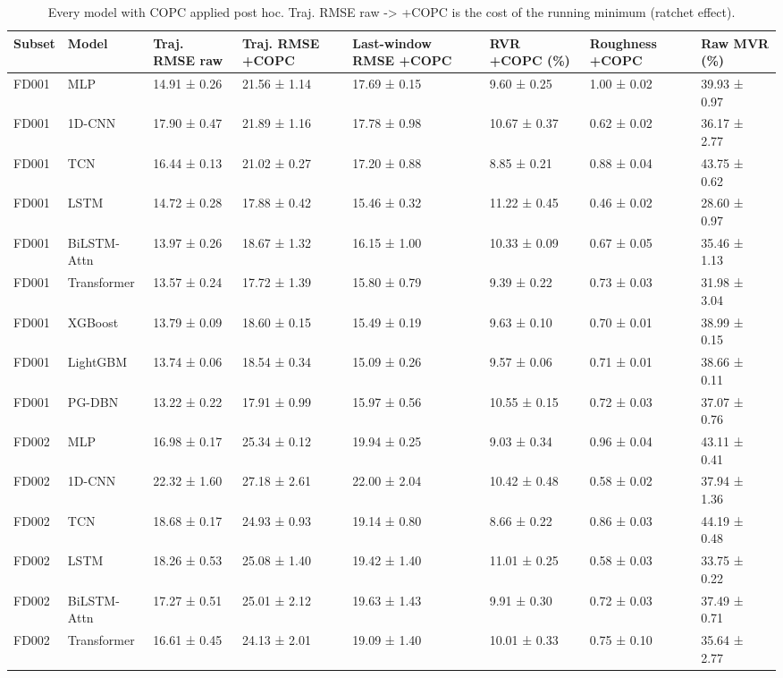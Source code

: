 \begin{table}
\caption{Every model with COPC applied post hoc. Traj. RMSE raw -> +COPC is the cost of the running minimum (ratchet effect).}
\label{tab:table1b_copc_all_models}
\begin{tabular}{llllllll}
\toprule
Subset & Model & Traj. RMSE raw & Traj. RMSE +COPC & Last-window RMSE +COPC & RVR +COPC (\%) & Roughness +COPC & Raw MVR (\%) \\
\midrule
FD001 & MLP & 14.91 ± 0.26 & 21.56 ± 1.14 & 17.69 ± 0.15 & 9.60 ± 0.25 & 1.00 ± 0.02 & 39.93 ± 0.97 \\
FD001 & 1D-CNN & 17.90 ± 0.47 & 21.89 ± 1.16 & 17.78 ± 0.98 & 10.67 ± 0.37 & 0.62 ± 0.02 & 36.17 ± 2.77 \\
FD001 & TCN & 16.44 ± 0.13 & 21.02 ± 0.27 & 17.20 ± 0.88 & 8.85 ± 0.21 & 0.88 ± 0.04 & 43.75 ± 0.62 \\
FD001 & LSTM & 14.72 ± 0.28 & 17.88 ± 0.42 & 15.46 ± 0.32 & 11.22 ± 0.45 & 0.46 ± 0.02 & 28.60 ± 0.97 \\
FD001 & BiLSTM-Attn & 13.97 ± 0.26 & 18.67 ± 1.32 & 16.15 ± 1.00 & 10.33 ± 0.09 & 0.67 ± 0.05 & 35.46 ± 1.13 \\
FD001 & Transformer & 13.57 ± 0.24 & 17.72 ± 1.39 & 15.80 ± 0.79 & 9.39 ± 0.22 & 0.73 ± 0.03 & 31.98 ± 3.04 \\
FD001 & XGBoost & 13.79 ± 0.09 & 18.60 ± 0.15 & 15.49 ± 0.19 & 9.63 ± 0.10 & 0.70 ± 0.01 & 38.99 ± 0.15 \\
FD001 & LightGBM & 13.74 ± 0.06 & 18.54 ± 0.34 & 15.09 ± 0.26 & 9.57 ± 0.06 & 0.71 ± 0.01 & 38.66 ± 0.11 \\
FD001 & PG-DBN & 13.22 ± 0.22 & 17.91 ± 0.99 & 15.97 ± 0.56 & 10.55 ± 0.15 & 0.72 ± 0.03 & 37.07 ± 0.76 \\
FD002 & MLP & 16.98 ± 0.17 & 25.34 ± 0.12 & 19.94 ± 0.25 & 9.03 ± 0.34 & 0.96 ± 0.04 & 43.11 ± 0.41 \\
FD002 & 1D-CNN & 22.32 ± 1.60 & 27.18 ± 2.61 & 22.00 ± 2.04 & 10.42 ± 0.48 & 0.58 ± 0.02 & 37.94 ± 1.36 \\
FD002 & TCN & 18.68 ± 0.17 & 24.93 ± 0.93 & 19.14 ± 0.80 & 8.66 ± 0.22 & 0.86 ± 0.03 & 44.19 ± 0.48 \\
FD002 & LSTM & 18.26 ± 0.53 & 25.08 ± 1.40 & 19.42 ± 1.40 & 11.01 ± 0.25 & 0.58 ± 0.03 & 33.75 ± 0.22 \\
FD002 & BiLSTM-Attn & 17.27 ± 0.51 & 25.01 ± 2.12 & 19.63 ± 1.43 & 9.91 ± 0.30 & 0.72 ± 0.03 & 37.49 ± 0.71 \\
FD002 & Transformer & 16.61 ± 0.45 & 24.13 ± 2.01 & 19.09 ± 1.40 & 10.01 ± 0.33 & 0.75 ± 0.10 & 35.64 ± 2.77 \\

\end{tabular}
\end{table}
